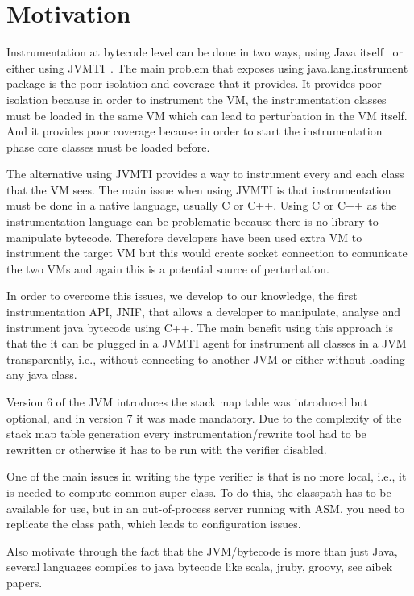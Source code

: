 \section{Motivation}
\label{section:motivation}


Instrumentation at bytecode level can be done in two ways, using Java itself~\cite{javainstr} or either using JVMTI~\cite{jvmti}.
The main problem that exposes using java.lang.instrument package is the poor isolation and coverage that it provides.
It provides poor isolation because in order to instrument the VM, the instrumentation classes must be loaded in the same VM which can lead to perturbation in the VM itself.
And it provides poor coverage because in order to start the instrumentation phase core classes must be loaded before.

The alternative using JVMTI provides a way to instrument every and each class that the VM sees. The main issue when using JVMTI is that instrumentation must be done in a native language, usually C or C++. Using C or C++ as the instrumentation language can be problematic because there is no library to manipulate bytecode. Therefore developers have been used extra VM to instrument the target VM but this would create socket connection to comunicate the two VMs and again this is a potential source of perturbation.

In order to overcome this issues, we develop to our knowledge, the first instrumentation API, JNIF, that allows a developer to manipulate, analyse and instrument java bytecode using C++. The main benefit using this approach is that the it can be plugged in a JVMTI agent for instrument all classes in a JVM transparently, i.e., without connecting to another JVM or either without loading any java class.

Version 6 of the JVM introduces the stack map table was introduced but optional, and in version 7 it was made mandatory. Due to the complexity of the stack map table generation every instrumentation/rewrite tool had to be rewritten or otherwise it has to be run with the verifier disabled.

One of the main issues in writing the type verifier is that is no more local, i.e., it is needed to compute common super class. To do this, the classpath has to be available for use, but in an out-of-process server running with ASM, you need to replicate the class path, which leads to configuration issues.

Also motivate through the fact that the JVM/bytecode is more than just Java, several languages compiles to java bytecode like scala, jruby, groovy, see aibek papers. 

